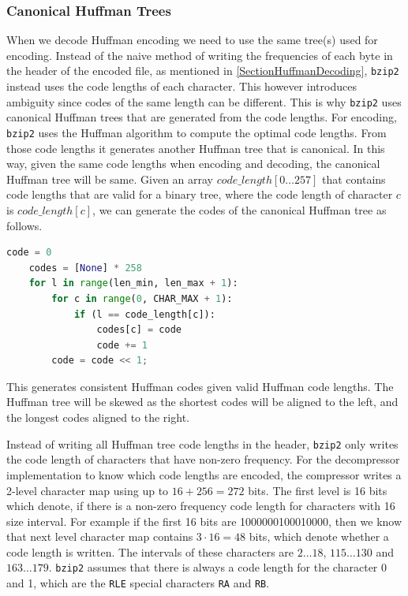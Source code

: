 \documentclass{article}
\begin{document}
\subsubsection{Canonical Huffman Trees}\label{CannonicalHuffmanTree}
When we decode Huffman encoding we need to use the same tree(s) used for encoding. Instead of the naive method of writing the frequencies of each byte in the header of the encoded file, as mentioned in \cref{SectionHuffmanDecoding}, \texttt{bzip2} instead uses the code lengths of each character. This however introduces ambiguity since codes of the same length can be different. This is why \texttt{bzip2} uses canonical Huffman trees that are generated from the code lengths. For encoding, \texttt{bzip2} uses the Huffman algorithm to compute the optimal code lengths. From those code lengths it generates another Huffman tree that is canonical. In this way, given the same code lengths when encoding and decoding, the canonical Huffman tree will be same.
Given an array \(code\_length[0 \dots 257]\) that contains code lengths that are valid for a binary tree, where the code length of character \(c\) is \(code\_length[c]\), we can generate the codes of the canonical Huffman tree as follows.
\begin{lstlisting}[language=Python, caption={We generate the codes that have shortest code lengths first. Line 7 changes the code by adding the value 1, for characters with the same length, and then another time before the length changes, to have prefix-free codes. We then bit shift by 1 since we descent one step down the Huffman tree (line 8).}]
    code = 0
    codes = [None] * 258
    for l in range(len_min, len_max + 1):
        for c in range(0, CHAR_MAX + 1):
            if (l == code_length[c]):
                codes[c] = code
                code += 1
        code = code << 1;
\end{lstlisting}
This generates consistent Huffman codes given valid Huffman code lengths. The Huffman tree will be skewed as the shortest codes will be aligned to the left, and the longest codes aligned to the right.

Instead of writing all Huffman tree code lengths in the header, \texttt{bzip2} only writes the code length of characters that have non-zero frequency. For the decompressor implementation to know which code lengths are encoded, the compressor writes a 2-level character map using up to \(16+256=272\) bits. The first level is 16 bits which denote, if there is a non-zero frequency code length for characters with 16 size interval. For example if the first 16 bits are 1000000100010000, then we know that next level character map contains \(3 \cdot 16 = 48\) bits, which denote whether a code length is written. The intervals of these characters are \(2 \dots 18\), \(115 \dots 130\) and \(163 \dots 179\).
\texttt{bzip2} assumes that there is always a code length for the character 0 and 1, which are the \texttt{RLE} special characters \texttt{RA} and \texttt{RB}.
\end{document}
